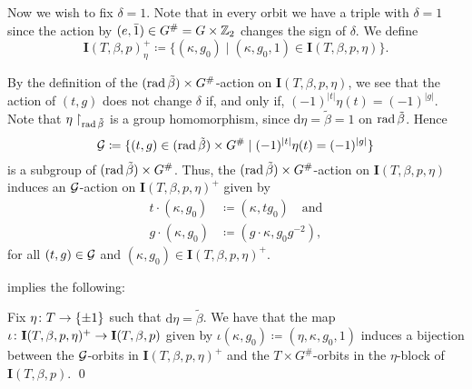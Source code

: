 Now we wish to fix $\delta = 1$.
Note that in every orbit we have a triple with $\delta = 1$ since the action by $(e, \bar1) \in G^\# = G \times \mathbb{Z}_2$ changes the sign of $\delta$.
We define
\[\label{eq:I-eta-plus}
	\mathbf{I}(T, \beta, p)_\eta^+ \coloneqq \{ (\kappa, g_0) \mid (\kappa, g_0, 1) \in \mathbf{I}(T, \beta, p, \eta)\}.
\]

By the definition of the $(\operatorname{rad} \tilde\beta) \times G^\#$-action on $\mathbf{I}(T, \beta, p, \eta)$, we see that the action of $(t,g)$ does not change $\delta$ if, and only if, $
	(-1)^{|t|}\eta(t) = (-1)^{|g|}.
$
Note that $\eta\restriction_{\operatorname{rad} \tilde\beta}$ is a group homomorphism, since $\mathrm{d}\eta = \tilde\beta = 1$ on $\operatorname{rad} \tilde\beta$.
Hence
\[\label{eq:mathcal-G}
	\mathcal G \coloneqq \{ (t,g) \in (\operatorname{rad} \tilde\beta) \times G^\# \mid (-1)^{|t|}\eta(t) = (-1)^{|g|} \}
\]
is a subgroup of $(\operatorname{rad} \tilde\beta) \times G^\#$.
Thus, the $(\operatorname{rad} \tilde\beta) \times G^\#$-action on $\mathbf{I}(T, \beta, p, \eta)$ induces an $\mathcal G$-action on $\mathbf{I}(T, \beta, p, \eta)^+$ given by
\begin{align}
	t \cdot (\kappa, g_0) & \coloneqq (\kappa, t g_0)
	\quad \text{and}                                               \\
	g \cdot (\kappa, g_0) & \coloneqq (g\cdot \kappa, g_0 g^{-2}),
\end{align}
for all $(t, g)\in \mathcal G$ and $(\kappa, g_0) \in \mathbf{I}(T, \beta, p, \eta)^+$. 

 implies the following:

\begin{prop}\label{prop:after-fixing-delta}
	Fix $\eta\colon T \to \{ \pm 1 \}$ such that $\mathrm{d}\eta = \tilde\beta$.
	We have that the map $\iota\colon \mathbf{I}(T,\beta,p,\eta)^+ \to \mathbf{I}(T,\beta,p)$ given by $\iota(\kappa, g_0) \coloneqq (\eta,\kappa, g_0, 1)$ induces a bijection between the $\mathcal G$-orbits in $\mathbf{I}(T,\beta,p,\eta)^+$ and the $T\times G^\#$-orbits in the $\eta$-block of $\mathbf{I}(T,\beta,p)$. \qed
\end{prop}


